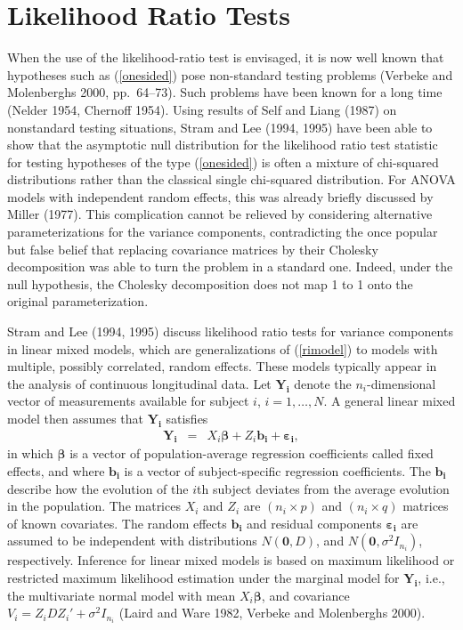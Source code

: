 \documentclass[useAMS,usenatbib,referee]{biom}
\newcommand{\Yi}{\bm{Y_i}}
\newcommand{\epsi}{\bm{\varepsilon_i}}
\newcommand{\bi}{\bm{b_i}}
\begin{document}
\section{ Likelihood Ratio Tests\label{likelihood ratio}}

When the use of the likelihood-ratio test is envisaged, it is now well
known that hypotheses such as (\ref{onesided}) pose non-standard
testing problems (Verbeke and Molenberghs 2000, pp.\ 64--73). Such
problems have been known for a long time (Nelder 1954, Chernoff
1954). Using results of Self and Liang (1987) on nonstandard testing
situations, Stram and Lee (1994, 1995) have been able to show that the
asymptotic null distribution for the likelihood ratio test statistic
for testing hypotheses of the type (\ref{onesided}) is often a mixture
of chi-squared distributions rather than the classical single
chi-squared distribution.  For ANOVA models with independent random
effects, this was already briefly discussed by Miller (1977). This
complication cannot be relieved by considering alternative
parameterizations for the variance components, contradicting the once
popular but false belief that replacing covariance matrices by their
Cholesky decomposition was able to turn the problem in a standard
one. Indeed, under the null hypothesis, the Cholesky decomposition
does not map 1 to 1 onto the original parameterization.

Stram and Lee (1994, 1995) discuss likelihood ratio tests for variance
components in linear mixed models, which are generalizations of
(\ref{rimodel}) to models with multiple, possibly correlated, random
effects. These models typically appear in the analysis of continuous
longitudinal data. Let $\Yi$ denote the $n_i$-dimensional vector of
measurements available for subject $i$, $i=1,\ldots,N$. A general
linear mixed model then assumes that $\Yi$ satisfies
\begin{eqnarray}
\Yi & = & X_i \bm\beta + Z_i \bi + \epsi, \label{linmixmodel}
\end{eqnarray}
in which $\bm\beta$ is a vector of population-average regression
coefficients called fixed effects, and where $\bi$ is a vector of
subject-specific regression coefficients. The $\bi$ describe how the
evolution of the $i$th subject deviates from the average evolution in
the population. The matrices $X_i$ and $Z_i$ are $(n_i \times p)$ and
$(n_i \times q)$ matrices of known covariates. The random effects
$\bi$ and residual components $\epsi$ are assumed to be independent
with distributions $N(\bm{0}, D)$, and $N(\bm{0}, \sigma^2 I_{n_i})$,
respectively.  Inference for linear mixed models is based on maximum
likelihood or restricted maximum likelihood estimation under the
marginal model for $\Yi$, i.e., the multivariate normal model with
mean $X_i\bm\beta$, and covariance $V_i=Z_iDZ_i' + \sigma^2 I_{n_i}$
(Laird and Ware 1982, Verbeke and Molenberghs 2000).
\end{document}
